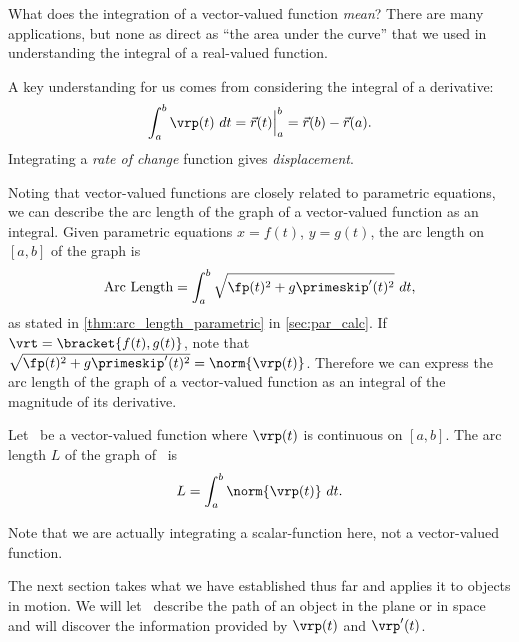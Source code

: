 What does the integration of a vector-valued function \emph{mean}? There are many applications, but none as direct as ``the area under the curve'' that we used in understanding the integral of a real-valued function.

A key understanding for us comes from considering the integral of a derivative: \[\int_a^b \vrp(t)\ dt = \vec r(t)\Big|_a^b = \vec r(b)-\vec r(a).\]
Integrating a \emph{rate of change} function gives \emph{displacement}.

Noting that vector-valued functions are closely related to parametric equations, we can describe the arc length of the graph of a vector-valued function as an integral. Given parametric equations $x=f(t)$, $y=g(t)$, the arc length on $[a,b]$ of the graph is
\[\text{Arc Length} = \int_a^b\sqrt{\fp(t)^2+g\primeskip'(t)^2}\ dt,\]
as stated in \autoref{thm:arc_length_parametric} in \autoref{sec:par_calc}. If $\vrt =\bracket{f(t), g(t)}$, note that $\sqrt{\fp(t)^2+g\primeskip'(t)^2} = \norm{\vrp(t)}$. Therefore we can express the arc length of the graph of a vector-valued function as an integral of the magnitude of its derivative.

\begin{theorem}\label{thm:vvf_arc_length}
Let \vrt\ be a vector-valued function where $\vrp(t)$ is continuous on $[a,b]$. The arc length $L$ of the graph of \vrt\ is 
\[L = \int_a^b \norm{\vrp(t)}\ dt.\]
\end{theorem}

Note that we are actually integrating a scalar-function here, not a vector-valued function.

The next section takes what we have established thus far and applies it to objects in motion. We will let \vrt\ describe the path of an object in the plane or in space and will discover the information provided by $\vrp(t)$ and $\vrp'(t)$.

